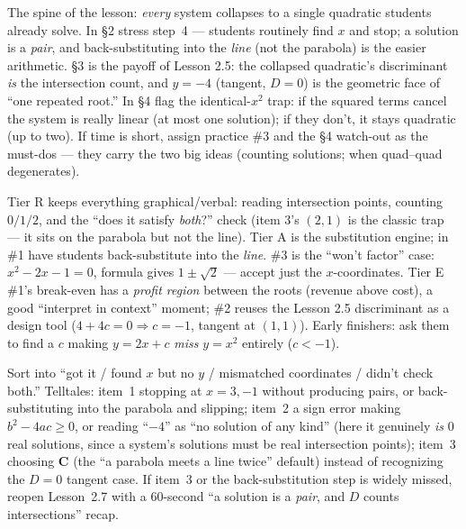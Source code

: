 \documentclass[10pt]{article}
\begin{document}
\begin{teachernote}
The spine of the lesson: \emph{every} system collapses to a single quadratic students already solve. In \S2 stress
step~4 --- students routinely find $x$ and stop; a solution is a \emph{pair}, and back-substituting into the
\emph{line} (not the parabola) is the easier arithmetic. \S3 is the payoff of Lesson 2.5: the collapsed quadratic's
discriminant \emph{is} the intersection count, and $y=-4$ (tangent, $D=0$) is the geometric face of ``one repeated
root.'' In \S4 flag the identical-$x^2$ trap: if the squared terms cancel the system is really linear (at most one
solution); if they don't, it stays quadratic (up to two). If time is short, assign practice \#3 and the \S4
watch-out as the must-dos --- they carry the two big ideas (counting solutions; when quad--quad degenerates).
\end{teachernote}

\begin{teachernote}
Tier R keeps everything graphical/verbal: reading intersection points, counting $0/1/2$, and the ``does it satisfy
\emph{both}?'' check (item 3's $(2,1)$ is the classic trap --- it sits on the parabola but not the line). Tier A is
the substitution engine; in \#1 have students back-substitute into the \emph{line}. \#3 is the ``won't factor''
case: $x^2-2x-1=0$, formula gives $1\pm\sqrt2$ --- accept just the $x$-coordinates. Tier E \#1's break-even has a
\emph{profit region} between the roots (revenue above cost), a good ``interpret in context'' moment; \#2 reuses the
Lesson 2.5 discriminant as a design tool ($4+4c=0\Rightarrow c=-1$, tangent at $(1,1)$). Early finishers: ask them
to find a $c$ making $y=2x+c$ \emph{miss} $y=x^2$ entirely ($c<-1$).
\end{teachernote}

\begin{teachernote}
Sort into ``got it / found $x$ but no $y$ / mismatched coordinates / didn't check both.'' Telltales: item~1 stopping
at $x=3,-1$ without producing pairs, or back-substituting into the parabola and slipping; item~2 a sign error making
$b^2-4ac\ge0$, or reading ``$-4$'' as ``no solution of any kind'' (here it genuinely \emph{is} $0$ real solutions,
since a system's solutions must be real intersection points); item~3 choosing \textbf{C} (the ``a parabola meets a
line twice'' default) instead of recognizing the $D=0$ tangent case. If item~3 or the back-substitution step is
widely missed, reopen Lesson~2.7 with a 60-second ``a solution is a \emph{pair}, and $D$ counts intersections'' recap.
\end{teachernote}
\end{document}
